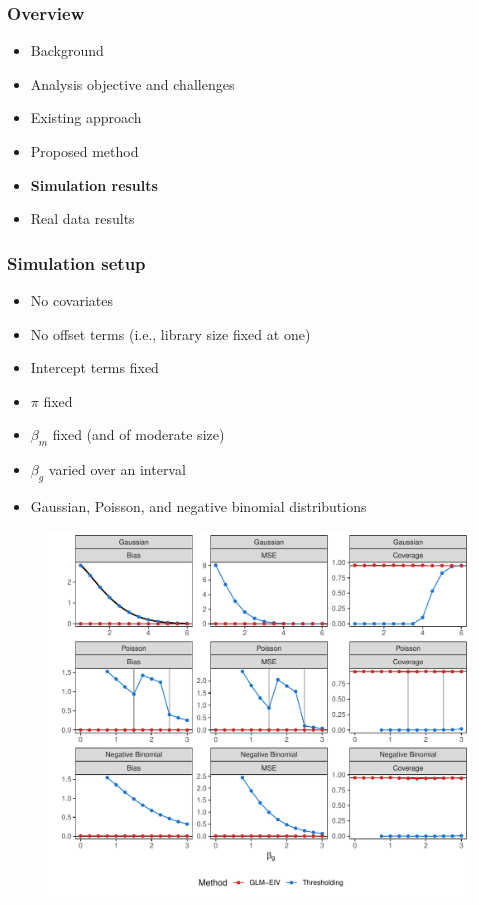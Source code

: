 \documentclass{beamer}
\begin{document}
\begin{frame}
\frametitle{Overview}
\begin{itemize}
	\item Background
	\item Analysis objective and challenges
	\item Existing approach
	\item Proposed method
	\item \textbf{Simulation results}
	\item Real data results
\end{itemize}
\end{frame}

\begin{frame}
\frametitle{Simulation setup}
\begin{itemize}
\item No covariates
\item No offset terms (i.e., library size fixed at one)
\item Intercept terms fixed
\item $\pi$ fixed
\item $\beta_m$ fixed (and of moderate size)
\item $\beta_g$ varied over an interval
\item Gaussian, Poisson, and negative binomial distributions
\end{itemize}
\end{frame}

\begin{frame}
\begin{figure}
	\centering
	\includegraphics[width=1\linewidth]{../figures/fig3/simulation_warmup_arm_g}
\end{figure}
\end{frame}
\end{document}
